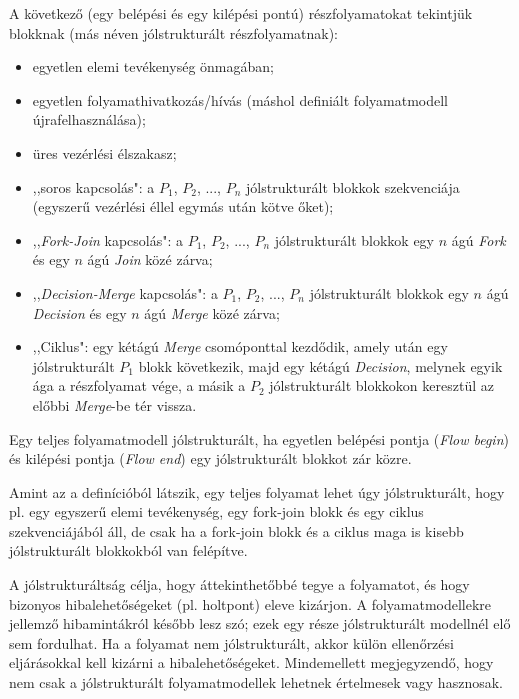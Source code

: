 \begin{definicio}
A következő (egy belépési és egy kilépési pontú) részfolyamatokat tekintjük  blokknak (más néven jólstrukturált részfolyamatnak):

\begin{itemize}
\item egyetlen elemi tevékenység önmagában;
\item egyetlen folyamathivatkozás/hívás (máshol definiált folyamatmodell újrafelhasználása);
\item üres vezérlési élszakasz;
\item ,,soros kapcsolás": a $P_1$, $P_2$, ..., $P_n$ jólstrukturált blokkok szekvenciája (egyszerű vezérlési éllel egymás után kötve őket);
\item ,,\emph{Fork-Join} kapcsolás": a $P_1$, $P_2$, ..., $P_n$ jólstrukturált blokkok egy $n$ ágú \emph{Fork} és egy $n$ ágú \emph{Join} közé zárva;
\item ,,\emph{Decision-Merge} kapcsolás": a $P_1$, $P_2$, ..., $P_n$ jólstrukturált blokkok egy $n$ ágú \emph{Decision} és egy $n$ ágú \emph{Merge} közé zárva;
\item ,,Ciklus": egy kétágú \emph{Merge} csomóponttal kezdődik, amely után egy jólstrukturált $P_1$ blokk következik, majd egy kétágú \emph{Decision}, melynek egyik ága a részfolyamat vége, a másik a $P_2$ jólstrukturált blokkokon keresztül az előbbi \emph{Merge}-be tér vissza.
\end{itemize}
Egy teljes folyamatmodell jólstrukturált, ha egyetlen belépési pontja (\emph{Flow begin}) és kilépési pontja (\emph{Flow end}) egy jólstrukturált blokkot zár közre.
\end{definicio}

Amint az a definícióból látszik, egy teljes folyamat lehet úgy jólstrukturált, hogy pl. egy egyszerű elemi tevékenység, egy fork-join blokk és egy ciklus szekvenciájából áll, de csak ha a fork-join blokk és a ciklus maga is kisebb jólstrukturált blokkokból van felépítve.

A jólstrukturáltság célja, hogy áttekinthetőbbé tegye a folyamatot, és hogy bizonyos hibalehetőségeket (pl. holtpont) eleve kizárjon. A folyamatmodellekre jellemző hibamintákról később lesz szó; ezek egy része jólstrukturált modellnél elő sem fordulhat. Ha a folyamat nem jólstrukturált, akkor külön ellenőrzési eljárásokkal kell kizárni a hibalehetőségeket. Mindemellett megjegyzendő, hogy nem csak a jólstrukturált folyamatmodellek lehetnek értelmesek vagy hasznosak. %

